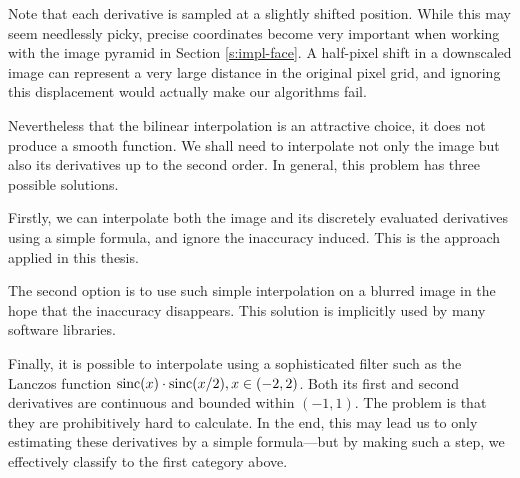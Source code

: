 Note that each derivative is sampled at a slightly shifted position.
While this may seem needlessly picky, precise coordinates become very important when working with the image pyramid in Section \ref{s:impl-face}.
A half-pixel shift in a downscaled image can represent a very large distance in the original pixel grid, and ignoring this displacement would actually make our algorithms fail.

Nevertheless that the bilinear interpolation is an attractive choice, it does not produce a smooth function.
We shall need to interpolate not only the image but also its derivatives up to the second order.
In general, this problem has three possible solutions.

Firstly, we can interpolate both the image and its discretely evaluated derivatives using a simple formula, and ignore the inaccuracy induced.
This is the approach applied in this thesis.

The second option is to use such simple interpolation on a blurred image in the hope that the inaccuracy disappears.
This solution is implicitly used by many software libraries.

Finally, it is possible to interpolate using a sophisticated filter such as the Lanczos function $\mathrm{sinc}(x) \cdot \mathrm{sinc}(x/2), x \in (-2, 2)$.
Both its first and second derivatives are continuous and bounded within $(-1, 1)$.
The problem is that they are prohibitively hard to calculate.
In the end, this may lead us to only estimating these derivatives by a simple formula---but by making such a step, we effectively classify to the first category above.
